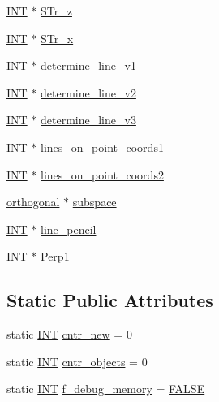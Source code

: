 \begin{DoxyCompactItemize}
\item 
\mbox{\hyperlink{galois_8h_a09fddde158a3a20bd2dcadb609de11dc}{I\+NT}} $\ast$ \mbox{\hyperlink{classorthogonal_ad27967ed5bcdd1b64c070a5b39d5deb9}{S\+Tr\+\_\+z}}
\item 
\mbox{\hyperlink{galois_8h_a09fddde158a3a20bd2dcadb609de11dc}{I\+NT}} $\ast$ \mbox{\hyperlink{classorthogonal_ac82a4f479d1f4d65865c7cc9d7cf156a}{S\+Tr\+\_\+x}}
\item 
\mbox{\hyperlink{galois_8h_a09fddde158a3a20bd2dcadb609de11dc}{I\+NT}} $\ast$ \mbox{\hyperlink{classorthogonal_a96047a2357421c8bbc110f5bf5121299}{determine\+\_\+line\+\_\+v1}}
\item 
\mbox{\hyperlink{galois_8h_a09fddde158a3a20bd2dcadb609de11dc}{I\+NT}} $\ast$ \mbox{\hyperlink{classorthogonal_a703d4651937d93729fbe29d6a89bda24}{determine\+\_\+line\+\_\+v2}}
\item 
\mbox{\hyperlink{galois_8h_a09fddde158a3a20bd2dcadb609de11dc}{I\+NT}} $\ast$ \mbox{\hyperlink{classorthogonal_a13e1c22b5cc700702305857c7ea57b5a}{determine\+\_\+line\+\_\+v3}}
\item 
\mbox{\hyperlink{galois_8h_a09fddde158a3a20bd2dcadb609de11dc}{I\+NT}} $\ast$ \mbox{\hyperlink{classorthogonal_a84418a4129dcb3b8110f1c130c5c921b}{lines\+\_\+on\+\_\+point\+\_\+coords1}}
\item 
\mbox{\hyperlink{galois_8h_a09fddde158a3a20bd2dcadb609de11dc}{I\+NT}} $\ast$ \mbox{\hyperlink{classorthogonal_ac52d3015d7f417619ce404f70e0d2c8a}{lines\+\_\+on\+\_\+point\+\_\+coords2}}
\item 
\mbox{\hyperlink{classorthogonal}{orthogonal}} $\ast$ \mbox{\hyperlink{classorthogonal_a6fa6e56ab6db63da20bb033fa8dce16e}{subspace}}
\item 
\mbox{\hyperlink{galois_8h_a09fddde158a3a20bd2dcadb609de11dc}{I\+NT}} $\ast$ \mbox{\hyperlink{classorthogonal_a04ca80d7087d0876a762f2d5db06a961}{line\+\_\+pencil}}
\item 
\mbox{\hyperlink{galois_8h_a09fddde158a3a20bd2dcadb609de11dc}{I\+NT}} $\ast$ \mbox{\hyperlink{classorthogonal_aa7e77dd1bbff064cd22e315d731c53e1}{Perp1}}
\end{DoxyCompactItemize}
\subsection*{Static Public Attributes}
\begin{DoxyCompactItemize}
\item 
static \mbox{\hyperlink{galois_8h_a09fddde158a3a20bd2dcadb609de11dc}{I\+NT}} \mbox{\hyperlink{classorthogonal_a0d829124baab1eddce0a484b164d2910}{cntr\+\_\+new}} = 0
\item 
static \mbox{\hyperlink{galois_8h_a09fddde158a3a20bd2dcadb609de11dc}{I\+NT}} \mbox{\hyperlink{classorthogonal_acae1df4d0e9071b4bd1952d7b902042e}{cntr\+\_\+objects}} = 0
\item 
static \mbox{\hyperlink{galois_8h_a09fddde158a3a20bd2dcadb609de11dc}{I\+NT}} \mbox{\hyperlink{classorthogonal_aa218dcfb184e0eb06bd7f7704fd031ec}{f\+\_\+debug\+\_\+memory}} = \mbox{\hyperlink{nauty_8h_aa93f0eb578d23995850d61f7d61c55c1}{F\+A\+L\+SE}}
\end{DoxyCompactItemize}


